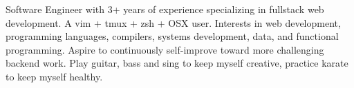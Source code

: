 

\begin{cvparagraph}

Software Engineer with 3+ years of experience specializing in fullstack web development. A vim + tmux + zsh + OSX user. Interests in web development, programming languages, compilers, systems development, data, and functional programming. Aspire to continuously self-improve toward more challenging backend work. Play guitar, bass and sing to keep myself creative, practice karate to keep myself healthy.

\end{cvparagraph}
